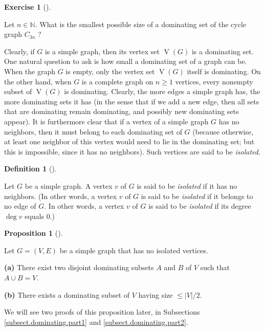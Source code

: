 \documentclass[numbers=enddot,12pt,final,onecolumn,notitlepage]{scrartcl}%
\theoremstyle{definition}
\newtheorem{prop}[theo]{Proposition}
\newenvironment{proposition}[1][]
{\begin{prop}[#1]\begin{leftbar}}
{\end{leftbar}\end{prop}}
\newtheorem{defi}[theo]{Definition}
\newenvironment{definition}[1][]
{\begin{defi}[#1]\begin{leftbar}}
{\end{leftbar}\end{defi}}
\newtheorem{exmp}[theo]{Exercise}
\newenvironment{exercise}[1][]
{\begin{exmp}[#1]\begin{leftbar}}
{\end{leftbar}\end{exmp}}
\newcommand{\NN}{\mathbb{N}}
\newcommand{\abs}[1]{\left| #1 \right|}
\newcommand{\tup}[1]{\left( #1 \right)}
\newcommand{\verts}[1]{\operatorname{V}\left( #1 \right)}
\begin{document}
\begin{exercise}
Let $n \in \NN$. What is the smallest possible size of a dominating
set of the cycle graph $C_{3n}$ ?
\end{exercise}

Clearly, if $G$ is a simple graph, then its vertex set $\verts{G}$ is
a dominating set.
One natural question to ask is how small a dominating set of a graph
can be. When the graph $G$ is empty, only the vertex set $\verts{G}$
itself is dominating. On the other hand, when $G$ is a complete graph
on $n \geq 1$ vertices, every nonempty subset of $\verts{G}$ is
dominating. Clearly, the more edges a simple graph has, the more
dominating sets it has (in the sense that if we add a new edge, then
all sets that are dominating remain dominating, and possibly new
dominating sets appear). It is furthermore clear that if a vertex of
a simple graph $G$ has no neighbors, then it must belong to each
dominating set of $G$ (because otherwise, at least one neighbor of
this vertex would need to lie in the dominating set; but this is
impossible, since it has no neighbors). Such vertices are said to be
\textit{isolated}.

\begin{definition} \label{def.intro.isolated}
Let $G$ be a simple graph. A vertex $v$ of $G$ is said to be
\textit{isolated} if it has no neighbors. (In other words, a vertex
$v$ of $G$ is said to be \textit{isolated} if it belongs to no edge
of $G$. In other words, a vertex
$v$ of $G$ is said to be \textit{isolated} if its degree $\deg v$
equals $0$.)
\end{definition}

\begin{proposition} \label{prop.dominating.|V|/2}
Let $G = \tup{V, E}$ be a simple graph that has no isolated vertices.

\textbf{(a)} There exist two disjoint dominating subsets $A$ and $B$
of $V$ such that $A \cup B = V$.

\textbf{(b)} There exists a dominating subset of $V$ having size
$\leq \abs{V}/2$.
\end{proposition}

We will see two proofs of this proposition later, in Subsections
\ref{subsect.dominating.part1} and \ref{subsect.dominating.part2}.
\end{document}
